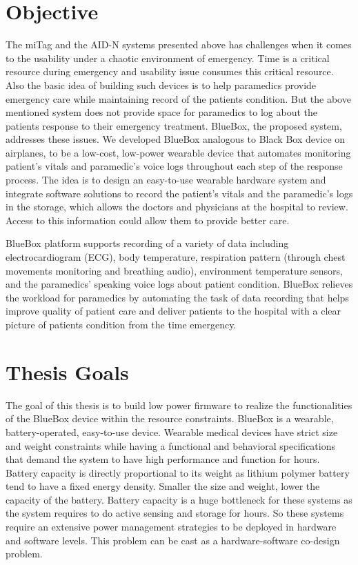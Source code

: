 \section{Objective}

The miTag and the AID-N systems presented above has challenges when
it comes to the usability under a chaotic environment of emergency.
Time is a critical resource during emergency and usability issue
consumes this critical resource. Also the basic idea of building such
devices is to help paramedics provide emergency care while
maintaining record of the patients condition. But the above mentioned
system does not provide space for paramedics to log about the
patients response to their emergency treatment. BlueBox, the proposed
system, addresses these issues.  We developed BlueBox analogous to
Black Box device on airplanes, to be a low-cost, low-power wearable
device that automates monitoring patient's vitals and paramedic's
voice logs throughout each step of the response process. The idea is
to design an easy-to-use wearable hardware system and integrate software
solutions to record the patient's vitals and the paramedic's logs in
the storage, which allows the doctors and physicians at the hospital
to review. Access to this information could allow them to provide
better care.

BlueBox platform supports recording of a variety of data including
electrocardiogram (ECG), body temperature, respiration pattern
(through chest movements monitoring and breathing audio), environment
temperature sensors, and the paramedics' speaking voice logs about
patient condition.  BlueBox relieves the workload for paramedics by
automating the task of data recording that helps improve quality of
patient care and deliver patients to the hospital with a clear
picture of patients condition from the time emergency. 

\section{Thesis Goals}

The goal of this thesis is to build low power firmware to realize the
functionalities of the BlueBox device within the resource
constraints. BlueBox is a wearable, battery-operated, easy-to-use
device. Wearable medical devices have strict size and weight
constraints while having a functional and behavioral specifications
that demand the system to have high performance and function for
hours. Battery capacity is directly proportional to its weight as
lithium polymer battery tend to have a fixed energy density. Smaller
the size and weight, lower the capacity of the battery. Battery
capacity is a huge bottleneck for these systems as the system
requires to do active sensing and storage for hours. So these systems
require an extensive power management strategies to be deployed in
hardware and software levels. This problem can be cast as a
hardware-software co-design problem.

